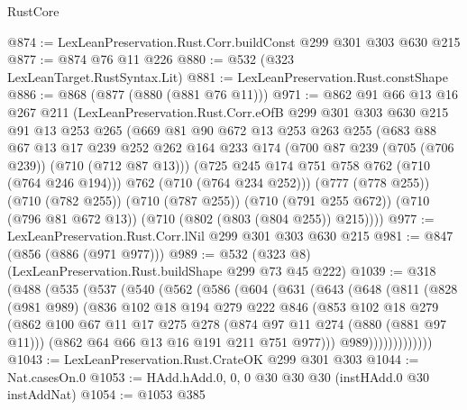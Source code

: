 \begin{lexlean}{RustCore}
\begin{coremodule}
@874 := LexLeanPreservation.Rust.Corr.buildConst @299 @301 @303 @630 @215
@877 := @874 @76 @11 @226
@880 := @532 (@323 LexLeanTarget.RustSyntax.Lit)
@881 := LexLeanPreservation.Rust.constShape
@886 := @868 (@877 (@880 (@881 @76 @11)))
@971 := @862
    @91
    @66
    @13
    @16
    @267
    @211
    (LexLeanPreservation.Rust.Corr.eOfB
      @299
      @301
      @303
      @630
      @215
      @91
      @13
      @253
      @265
      (@669
        @81
        @90
        @672
        @13
        @253
        @263
        @255
        (@683
          @88
          @67
          @13
          @17
          @239
          @252
          @262
          @164
          @233
          @174
          (@700 @87 @239 (@705 (@706 @239)) (@710 (@712 @87 @13)))
          (@725 @245 @174 @751 @758 @762 (@710 (@764 @246 @194)))
          @762
          (@710 (@764 @234 @252)))
        (@777 (@778 @255))
        (@710 (@782 @255))
        (@710 (@787 @255))
        (@710 (@791 @255 @672))
        (@710 (@796 @81 @672 @13))
        (@710 (@802 (@803 (@804 @255)) @215))))
@977 := LexLeanPreservation.Rust.Corr.lNil @299 @301 @303 @630 @215
@981 := @847 (@856 (@886 (@971 @977)))
@989 := @532 (@323 @8) (LexLeanPreservation.Rust.buildShape @299 @73 @45 @222)
@1039 := @318
    (@488
      (@535
        (@537
          (@540
            (@562
              (@586
                (@604
                  (@631
                    (@643
                      (@648
                        (@811
                          (@828
                            (@981 @989)
                            (@836
                              @102
                              @18
                              @194
                              @279
                              @222
                              @846
                              (@853
                                @102
                                @18
                                @279
                                (@862
                                  @100
                                  @67
                                  @11
                                  @17
                                  @275
                                  @278
                                  (@874 @97 @11 @274 (@880 (@881 @97 @11)))
                                  (@862 @64 @66 @13 @16 @191 @211 @751 @977)))
                              @989)))))))))))))
@1043 := LexLeanPreservation.Rust.CrateOK @299 @301 @303
@1044 := Nat.casesOn.{0}
@1053 := HAdd.hAdd.{0, 0, 0} @30 @30 @30 (instHAdd.{0} @30 instAddNat)
@1054 := @1053 @385

\end{coremodule}
\end{lexlean}
